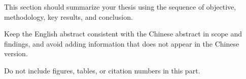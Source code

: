 \begin{eabstract}
\linespread{0.9}\selectfont
This section should summarize your thesis using the sequence of objective, methodology, key results, and conclusion.

Keep the English abstract consistent with the Chinese abstract in scope and findings, and avoid adding information that does not appear in the Chinese version.

Do not include figures, tables, or citation numbers in this part.

\end{eabstract}
